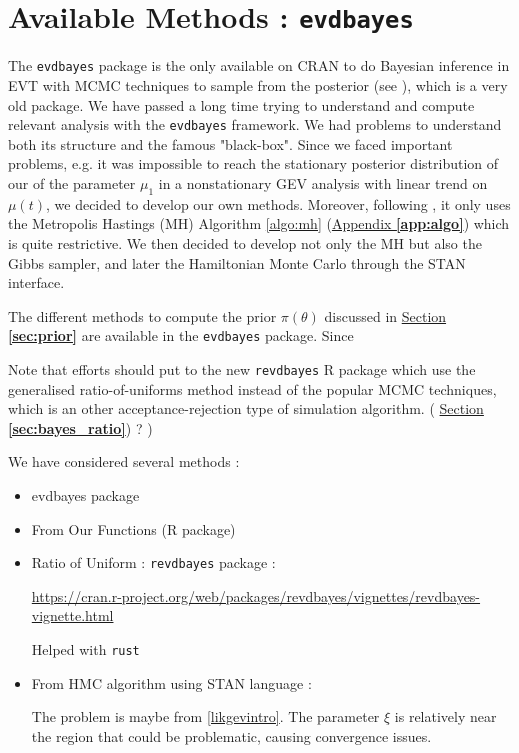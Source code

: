 \section{Available Methods : \texttt{evdbayes}}

The \texttt{evdbayes} package is the only available on CRAN to do Bayesian inference in EVT with MCMC techniques to sample from the posterior (see \citet{ribatet_users_2006}), which is a very old package. We have passed a long time trying to understand and compute relevant analysis with the \texttt{evdbayes} framework. We had problems to understand both its structure and the famous "black-box".
 Since we faced important problems, e.g. it was impossible to reach the stationary posterior distribution of our of the parameter $\mu_1$ in a nonstationary GEV analysis with linear trend on $\mu(t)$, we decided to develop our own methods. Moreover, following \citet{hartmann_bayesian_2016}, it only uses the Metropolis Hastings (MH) Algorithm \ref{algo:mh} (\hyperref[app:algo]{Appendix \textbf{\ref{app:algo}}}) which is quite restrictive. We then decided to develop not only the MH but also the Gibbs sampler, and later the Hamiltonian Monte Carlo through the STAN interface. 

The different methods to compute the prior $\pi(\theta)$ discussed in \hyperref[sec:prior]{Section \textbf{\ref{sec:prior}}} are available in the \texttt{evdbayes} package. Since 


 Note that efforts should put to the new \texttt{revdbayes} R package which use the generalised ratio-of-uniforms method instead of the popular MCMC techniques, which is an other acceptance-rejection type of simulation algorithm. ( \hyperref[sec:bayes_ratio]{Section \textbf{\ref{sec:bayes_ratio}}}) ? )
 
 
 
 We have considered several methods : 
 
 \begin{itemize}
 	\item evdbayes package
 	\item From Our Functions (R package)
 	\item Ratio of Uniform : \texttt{revdbayes} package :
 	
 	\url{https://cran.r-project.org/web/packages/revdbayes/vignettes/revdbayes-vignette.html}
 	
 	Helped with \texttt{rust}
 	
 	\item From HMC algorithm using STAN language :
 	
 	The problem is maybe from \ref{likgevintro}. The parameter $\xi$ is relatively near the region that could be problematic, causing convergence issues. 
 	
 \end{itemize}

